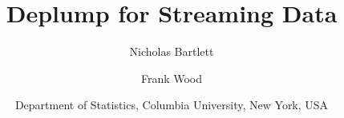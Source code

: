 \documentclass[oneside,letterpaper,12pt]{article}
\title{Deplump for Streaming Data}
\author{Nicholas Bartlett  \and Frank Wood}
\date{
\small Department of Statistics, Columbia University, New York, USA}
\begin{document}
\maketitle









%

%

%

%

%


\renewcommand{\bibsection}{\subsubsection*{References}}
\setlength{\bibsep}{0mm}

\end{document}
